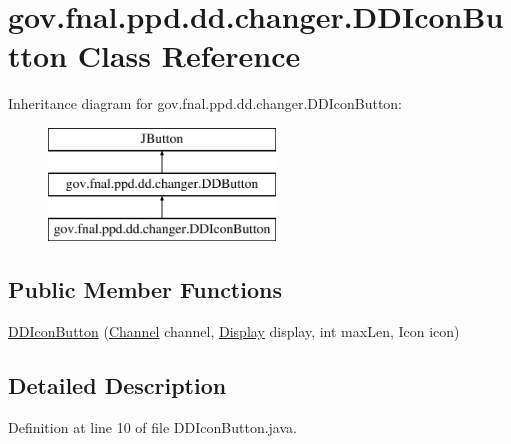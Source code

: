 \hypertarget{classgov_1_1fnal_1_1ppd_1_1dd_1_1changer_1_1DDIconButton}{\section{gov.\-fnal.\-ppd.\-dd.\-changer.\-D\-D\-Icon\-Button Class Reference}
\label{classgov_1_1fnal_1_1ppd_1_1dd_1_1changer_1_1DDIconButton}
}
Inheritance diagram for gov.\-fnal.\-ppd.\-dd.\-changer.\-D\-D\-Icon\-Button\-:\begin{figure}[H]
\begin{center}
\leavevmode
\includegraphics[height=3.000000cm]{classgov_1_1fnal_1_1ppd_1_1dd_1_1changer_1_1DDIconButton}
\end{center}
\end{figure}
\subsection*{Public Member Functions}
\begin{DoxyCompactItemize}
\item 
\hyperlink{classgov_1_1fnal_1_1ppd_1_1dd_1_1changer_1_1DDIconButton_a3ce3ff53b260e4cbbc984438c6b6d76a}{D\-D\-Icon\-Button} (\hyperlink{interfacegov_1_1fnal_1_1ppd_1_1dd_1_1signage_1_1Channel}{Channel} channel, \hyperlink{interfacegov_1_1fnal_1_1ppd_1_1dd_1_1signage_1_1Display}{Display} display, int max\-Len, Icon icon)
\end{DoxyCompactItemize}


\subsection{Detailed Description}


Definition at line 10 of file D\-D\-Icon\-Button.\-java.



